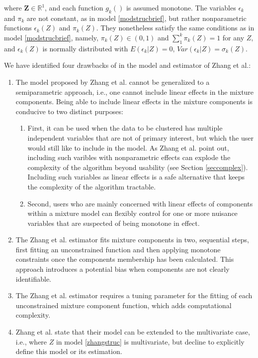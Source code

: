 \documentclass[10pt]{olplainarticle}\usepackage[]{graphicx}\usepackage[]{color}
\begin{document}
where $\boldsymbol{Z} \in \mathbb{R}^1$, and each function $g_{k}()$ is assumed monotone. The variables $\epsilon_k$ and $\pi_k$ are not constant, as in model \ref{modstrucbrief}, but rather nonparametric functions $\epsilon_k(Z)$ and $\pi_k(Z)$. They nonetheless satisfy the same conditions as in model \ref{modstrucbrief}, namely, $\pi_k(Z) \in (0,1)$ and $\sum_{1}^{k} \pi_k(Z) = 1$ for any $Z$, and $\epsilon_k(Z)$ is normally distributed with $E(\epsilon_k | Z) = 0$, $Var(\epsilon_k | Z) = \sigma_k(Z)$. 

We have identified four drawbacks of in the model and estimator of Zhang et al.:

\begin{enumerate}[noitemsep] 
  \item The model proposed by Zhang et al. cannot be generalized to a semiparametric approach, i.e., one cannot include linear effects in the mixture components. Being able to include linear effects in the mixture components is conducive to two distinct purposes: 
    \begin{enumerate}[noitemsep]
      \item First, it can be used when the data to be clustered has multiple independent variables that are not of primary interest, but which the user would still like to include in the model. As Zhang et al. point out, including such varibles with nonparametric effects can explode the complexity of the algorithm beyond usability (see Section \ref{seccomplex}). Including such variables as linear effects is a safe alternative that keeps the complexity of the algorithm tractable.
      \item Second, users who are mainly concerned with linear effects of components within a mixture model can flexibly control for one or more nuisance variables that are suspected of being monotone in effect.
    \end{enumerate}
  \item The Zhang et al. estimator fits mixture components in two, sequential steps, first fitting an unconstrained function and then applying monotone constraints once the components membership has been calculated. This approach introduces a potential bias when components are not clearly identifiable.
  \item The Zhang et al. estimator requires a tuning parameter for the fitting of each unconstrained mixture component function, which adds computational complexity.
  \item Zhang et al. state that their model can be extended to the multivariate case, i.e., where $Z$ in model \ref{zhangstruc} is multivariate, but decline to explicitly define this model or its estimation.
\end{enumerate}
\end{document}
